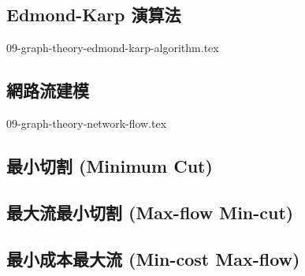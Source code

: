 \documentclass[12pt,a4paper,oneside]{report}
\begin{document}
\begin{CJK}{UTF8}{bkai}
\subsection{Edmond-Karp 演算法}

{09-graph-theory-edmond-karp-algorithm.tex}

\subsection{網路流建模}

{09-graph-theory-network-flow.tex}

\subsection{最小切割 (Minimum Cut)}
\subsection{最大流最小切割 (Max-flow Min-cut)}
\subsection{最小成本最大流 (Min-cost Max-flow)}
\ifx \allfiles \undefined
\printindex[noun]

\clearpage
\end{CJK}
\end{document}
